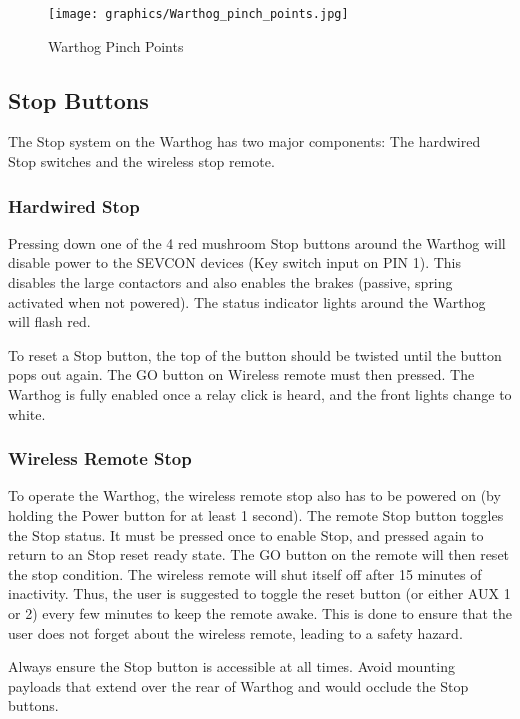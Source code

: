\documentclass[]{clearpath-latex/clearpath-manual}
\begin{document}
\begin{figure}[!htb]
  \centering
  \texttt{[image: graphics/Warthog\_pinch\_points.jpg]}
  \caption{Warthog Pinch Points}
  \label{pinchpoints}
\end{figure}

\pagebreak[4]
\subsection{Stop Buttons}

The Stop system on the Warthog has two major components: The hardwired Stop switches and the wireless stop remote.

\subsubsection{Hardwired Stop}

Pressing down one of the 4 red mushroom Stop buttons around the Warthog will disable power to the SEVCON devices (Key switch input on PIN 1). This disables the large contactors and also enables the brakes (passive, spring activated when not powered). The status indicator lights around the Warthog will flash red.

To reset a Stop button, the top of the button should be twisted until the button pops out again. The GO button on Wireless remote must then pressed. The Warthog is fully enabled once a relay click is heard, and the front lights change to white.

\subsubsection{Wireless Remote Stop}

To operate the Warthog, the wireless remote stop also has to be powered on (by holding the Power button for at least 1 second). The remote Stop button toggles the Stop status. It must be pressed once to enable Stop, and pressed again to return to an Stop reset ready state. The GO button on the remote will then reset the stop condition. The wireless remote will shut itself off after 15 minutes of inactivity. Thus, the user is suggested to toggle the reset button (or either AUX 1 or 2) every few minutes to keep the remote awake. This is done to ensure that the user does not forget about the wireless remote, leading to a safety hazard.

Always ensure the Stop button is accessible at all times. Avoid mounting payloads that extend over the rear of Warthog and would occlude the Stop buttons.
\end{document}

